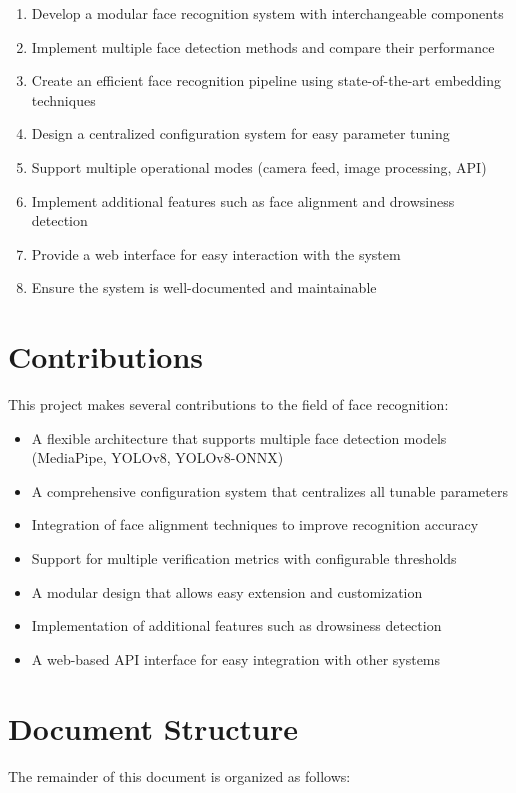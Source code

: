 \begin{enumerate}
    \item Develop a modular face recognition system with interchangeable components
    \item Implement multiple face detection methods and compare their performance
    \item Create an efficient face recognition pipeline using state-of-the-art embedding techniques
    \item Design a centralized configuration system for easy parameter tuning
    \item Support multiple operational modes (camera feed, image processing, API)
    \item Implement additional features such as face alignment and drowsiness detection
    \item Provide a web interface for easy interaction with the system
    \item Ensure the system is well-documented and maintainable
\end{enumerate}

\section{Contributions}
This project makes several contributions to the field of face recognition:

\begin{itemize}
    \item A flexible architecture that supports multiple face detection models (MediaPipe, YOLOv8, YOLOv8-ONNX)
    \item A comprehensive configuration system that centralizes all tunable parameters
    \item Integration of face alignment techniques to improve recognition accuracy
    \item Support for multiple verification metrics with configurable thresholds
    \item A modular design that allows easy extension and customization
    \item Implementation of additional features such as drowsiness detection
    \item A web-based API interface for easy integration with other systems
\end{itemize}

\section{Document Structure}
The remainder of this document is organized as follows:

